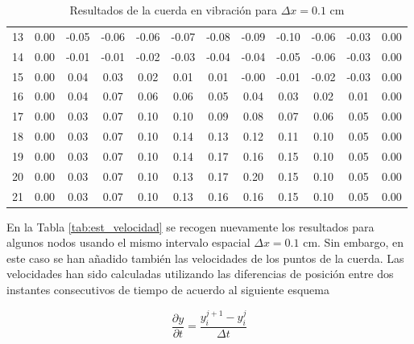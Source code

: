 \documentclass[11pt]{article}
\begin{document}
\begin{table}
\begin{small}
\begin{tabular}{ c c c c c c c c c c c c }
13 & 0.00 & -0.05 & -0.06 & -0.06 & -0.07 & -0.08 & -0.09 & -0.10 & -0.06 & -0.03 & 0.00 \\
14 & 0.00 & -0.01 & -0.01 & -0.02 & -0.03 & -0.04 & -0.04 & -0.05 & -0.06 & -0.03 & 0.00 \\
15 & 0.00 & 0.04 & 0.03 & 0.02 & 0.01 & 0.01 & -0.00 & -0.01 & -0.02 & -0.03 & 0.00 \\
16 & 0.00 & 0.04 & 0.07 & 0.06 & 0.06 & 0.05 & 0.04 & 0.03 & 0.02 & 0.01 & 0.00 \\
17 & 0.00 & 0.03 & 0.07 & 0.10 & 0.10 & 0.09 & 0.08 & 0.07 & 0.06 & 0.05 & 0.00 \\
18 & 0.00 & 0.03 & 0.07 & 0.10 & 0.14 & 0.13 & 0.12 & 0.11 & 0.10 & 0.05 & 0.00 \\
19 & 0.00 & 0.03 & 0.07 & 0.10 & 0.14 & 0.17 & 0.16 & 0.15 & 0.10 & 0.05 & 0.00 \\
\hline
20 & 0.00 & 0.03 & 0.07 & 0.10 & 0.13 & 0.17 & 0.20 & 0.15 & 0.10 & 0.05 & 0.00 \\
\hline
21 & 0.00 & 0.03 & 0.07 & 0.10 & 0.13 & 0.16 & 0.16 & 0.15 & 0.10 & 0.05 & 0.00 \\
\end{tabular}
\end{small}
\caption{Resultados de la cuerda en vibración para $\Delta{x} = 0.1$ cm}
\label{tab:est_freq}
\end{table}

En la Tabla \ref{tab:est_velocidad} se recogen nuevamente los resultados para algunos nodos
usando el mismo intervalo espacial $\Delta{x} = 0.1$ cm. Sin embargo, en este caso se han
añadido también las velocidades de los puntos de la cuerda. Las velocidades han sido
calculadas utilizando las diferencias de posición entre dos instantes consecutivos de
tiempo de acuerdo al siguiente esquema

\begin{equation}
\frac{\partial{y}}{\partial{t}} = \frac{y^{j + 1}_i - y^{j}_i}{\Delta{t}}
\end{equation} 
\end{document}
